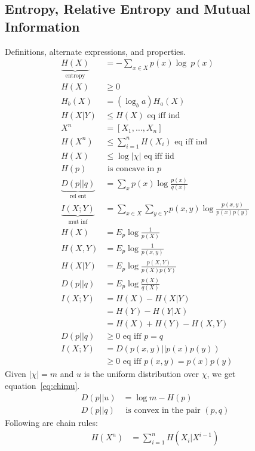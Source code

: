 \documentclass[10pt]{article}
\begin{document}
\begin{tiny}
\begin{multicols}{3}

\section*{Entropy, Relative Entropy and Mutual Information}
Definitions, alternate expressions, and properties.
\begin{align}
\underbrace{H(X)}_\text{entropy}&= -\sum_{x\in X} p(x) \log\ p(x) \label{eq:entropy}\\
H(X)& \geq 0\\
H_b(X)&= (\log_b a)H_a(X)\\
H(X|Y)& \leq  H(X)\text{ eq iff ind} \label{eq:conditioning}\\
X^n&=[X_1,\ldots,X_n]\\
H(X^n)& \leq \sum_{i=1}^n H(X_i)\text{ eq iff ind} \label{eq:jointsum}\\
H(X)&\leq  \log |\chi|  \text{ eq iff iid}\label{eq:alphabetentropy}\\
H(p)&\text{ is concave in $p$}\\
\underbrace{D(p||q)}_\text{rel ent} & = \sum_x p(x) \log \frac{p(x)}{q(x)}\\
\underbrace{I(X;Y)}_\text{mut inf} & = \sum_{x\in X} \sum_{y \in Y} p(x,y) \log \frac{p(x,y)}{p(x)p(y)}\\
H(X)&=E_p \log \frac{1}{p(X)}\\
H(X,Y)&=E_p\log \frac{1}{p(x,y)}\\
H(X|Y)&=E_p\log \frac{p(X,Y)}{p(X)p(Y)}\\
D(p||q)&=E_p\log \frac{p(X)}{q(X)}\\
I(X;Y)&=H(X)-H(X|Y)\\
&=H(Y)-H(Y|X)\\
&=H(X)+H(Y)-H(X,Y)\\
D(p||q)&\geq 0 \text{ eq iff $p=q$}\\
I(X;Y)&=D(p(x,y)||p(x)p(y))\\
	&\geq 0 \text{ eq iff $p(x,y)=p(x)p(y)$}
\end{align}
Given $|\chi|=m$ and $u$ is the uniform distribution over $\chi$, we get equation~\ref{eq:chimu}.
\begin{align}
D(p||u)&=\log m - H(p)\label{eq:chimu}\\
D(p||q)&\text{ is convex in the pair }(p,q)
\end{align}
Following are chain rules:
\begin{align}
H(X^n)&=\sum_{i=1}^n H(X_i|X^{i-1})\\

\end{align}
\end{multicols}
\end{tiny}
\end{document}

